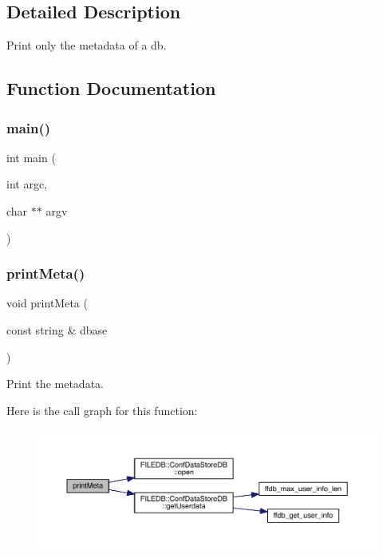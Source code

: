 \subsection{Detailed Description}
Print only the metadata of a db. 



\subsection{Function Documentation}
\mbox{\label{adat-devel_2main_2dbutil_2dbmeta_8cc_a3c04138a5bfe5d72780bb7e82a18e627}} 
\subsubsection{\texorpdfstring{main()}{main()}}
{\footnotesize\ttfamily int main (\begin{DoxyParamCaption}\item[{int}]{argc,  }\item[{char $\ast$$\ast$}]{argv }\end{DoxyParamCaption})}

\mbox{\label{adat-devel_2main_2dbutil_2dbmeta_8cc_a0577d572da492642f9cf5f404d0116d9}} 
\subsubsection{\texorpdfstring{printMeta()}{printMeta()}}
{\footnotesize\ttfamily void print\+Meta (\begin{DoxyParamCaption}\item[{const string \&}]{dbase }\end{DoxyParamCaption})}



Print the metadata. 

Here is the call graph for this function\+:
\nopagebreak
\begin{figure}[H]
\begin{center}
\leavevmode
\includegraphics[width=350pt]{d9/d61/adat-devel_2main_2dbutil_2dbmeta_8cc_a0577d572da492642f9cf5f404d0116d9_cgraph}
\end{center}
\end{figure}
